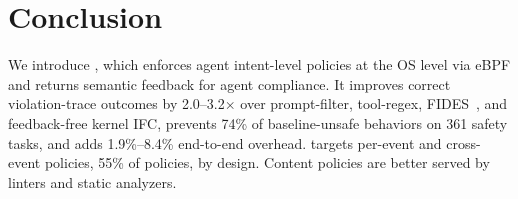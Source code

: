 \section{Conclusion}
\label{sec:conclusion}

We introduce \sys{}, which enforces agent intent-level policies at the OS level via eBPF and returns semantic feedback for agent compliance.
It improves correct violation-trace outcomes by 2.0--3.2$\times$ over prompt-filter, tool-regex, FIDES~\cite{costa2025fides}, and feedback-free kernel IFC, prevents 74\% of baseline-unsafe behaviors on 361 safety tasks, and adds 1.9\%--8.4\% end-to-end overhead.
\sys{} targets per-event and cross-event policies, 55\% of policies, by design.
Content policies are better served by linters and static analyzers.
